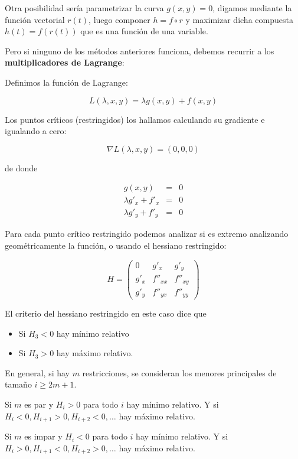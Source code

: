 Otra posibilidad sería parametrizar la curva $ g(x,y) = 0$, digamos mediante la función vectorial $ r(t)$, luego componer $h = f \circ r$ y maximizar dicha compuesta $h(t) = f(r(t))$ que es una función de una variable.

Pero si ninguno de los métodos anteriores funciona, debemos recurrir a los \textbf{multiplicadores de Lagrange}: 

Definimos la función de Lagrange:

$$ L(\lambda, x,y) = \lambda g(x,y) + f(x,y)$$

Los puntos críticos (restringidos) los hallamos calculando su gradiente e igualando a cero:

$$ \nabla L(\lambda, x,y) = (0,0,0)$$

de donde

\begin{eqnarray*} g(x,y) &=& 0 \\
\lambda g'_x + f'_x &=& 0 \\
\lambda g'_y + f'_y &=& 0 \end{eqnarray*}

Para cada punto crítico restringido podemos analizar si es extremo analizando geométricamente la función, o usando el hessiano restringido:

$$ H = \begin{pmatrix} 0 & g'_x & g'_y \\ g'_x & f''_{xx} & f''_{xy} \\ g'_y & f''_{yx} & f''_{yy} \end{pmatrix}$$

El criterio del hessiano restringido en este caso dice que 

\begin{itemize}

\item Si $ H_3 < 0$ hay mínimo relativo

\item Si $ H_3 > 0$ hay máximo relativo.

\end{itemize}

 En general, si hay $m$ restricciones, se consideran los menores principales de tamaño $ i \geq 2m+1$.
 
Si $m$ es par y $H_i > 0$ para todo $i$ hay mínimo relativo. Y si $ H_{i} < 0, H_{i+1} > 0, H_{i+2} < 0, \ldots$ hay máximo relativo.

Si $m$ es impar y $H_i < 0$ para todo $i$ hay mínimo relativo.  Y si $ H_i > 0, H_{i+1} < 0, H_{i+2} > 0, \ldots$ hay máximo relativo.



